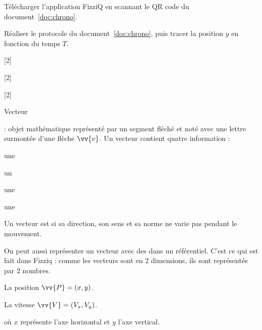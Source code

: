 \telechargement Télécharger l'application FizziQ en scannant le QR code du document~\ref{doc:chrono}.

\mesure Réaliser le protocole du document~\ref{doc:chrono}, puis tracer la position $y$ en fonction du temps $T$.

[2]

[2]


\pasCorrection{ \newpage \vspace*{-30pt} }
[2]

\begin{doc}{Vecteur}
  \begin{importants}
     : objet mathématique représenté par un segment fléché \reaction et noté avec une lettre surmontée d'une flèche $\vv{v}$.    
    Un vecteur contient quatre information : 
    \begin{listePoints}[4]
      \item une 
      \item un 
      \item une 
      \item une 
    \end{listePoints}
    \vspace*{-4pt}
  
    Un vecteur est  si sa direction, son sens et sa norme ne varie pas pendant le mouvement.
  \end{importants}
  On peut aussi représenter un vecteur avec des  dans un référentiel.
  C'est ce qui est fait dans Fizziq : comme les vecteurs sont en 2 dimensions, ils sont représentés par 2 nombres.
  \begin{listePoints}[2]
    \item La position $\vv{P} = (x, y)$.
    \item La vitesse $\vv{V} = (V_x, V_y)$.
  \end{listePoints}
  où $x$ représente l'axe horizontal et $y$ l'axe vertical.
\end{doc}


